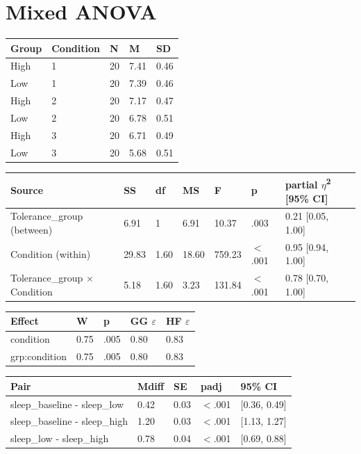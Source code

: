 \documentclass{article}
\begin{document}
\section{Mixed ANOVA}

\begin{tabular}{lllll}
\toprule
Group & Condition & N & M & SD \\
\midrule
High & 1 & 20 & 7.41 & 0.46 \\
Low & 1 & 20 & 7.39 & 0.46 \\
High & 2 & 20 & 7.17 & 0.47 \\
Low & 2 & 20 & 6.78 & 0.51 \\
High & 3 & 20 & 6.71 & 0.49 \\
Low & 3 & 20 & 5.68 & 0.51 \\
\bottomrule
\end{tabular}

\begin{tabular}{lllllll}
\toprule
Source & SS & df & MS & F & p & partial $\eta$\textsuperscript{2} [95\% CI] \\
\midrule
Tolerance\_group (between) & 6.91 & 1 & 6.91 & 10.37 & .003 & 0.21 [0.05, 1.00] \\
Condition (within) & 29.83 & 1.60 & 18.60 & 759.23 & $<$.001 & 0.95 [0.94, 1.00] \\
Tolerance\_group $\times$ Condition & 5.18 & 1.60 & 3.23 & 131.84 & $<$.001 & 0.78 [0.70, 1.00] \\
\bottomrule
\end{tabular}

\begin{tabular}{lllll}
\toprule
Effect & W & p & GG $\varepsilon$ & HF $\varepsilon$ \\
\midrule
condition & 0.75 & .005 & 0.80 & 0.83 \\
grp:condition & 0.75 & .005 & 0.80 & 0.83 \\
\bottomrule
\end{tabular}

\begin{tabular}{lllll}
\toprule
Pair & Mdiff & SE & padj & 95\% CI \\
\midrule
sleep\_baseline - sleep\_low & 0.42 & 0.03 & $<$.001 & [0.36, 0.49] \\
sleep\_baseline - sleep\_high & 1.20 & 0.03 & $<$.001 & [1.13, 1.27] \\
sleep\_low - sleep\_high & 0.78 & 0.04 & $<$.001 & [0.69, 0.88] \\
\bottomrule
\end{tabular}
\end{document}
